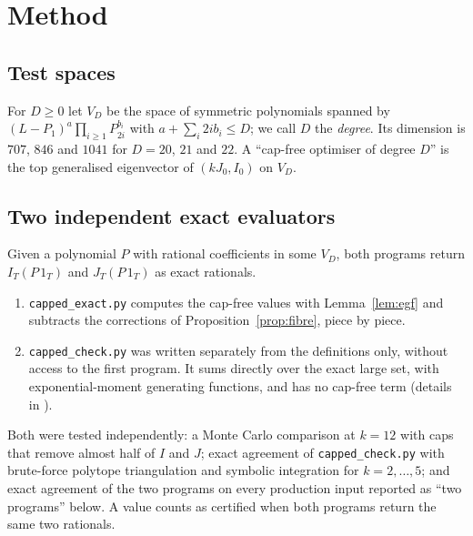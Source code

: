 \section{Method}

\subsection*{Test spaces}
For $D\ge0$ let $V_D$ be the space of symmetric polynomials spanned by
$(L-P_1)^a\prod_{i\ge1}P_{2i}^{b_i}$ with $a+\sum_i2ib_i\le D$; we call $D$
the \emph{degree}. Its dimension is $707$, $846$ and $1041$ for $D=20$, $21$
and $22$. A ``cap-free optimiser of degree $D$'' is the top generalised
eigenvector of $(kJ_0,I_0)$ on $V_D$.

\subsection*{Two independent exact evaluators}
Given a polynomial $P$ with rational coefficients in some $V_D$, both
programs return $I_T(P\,1_T)$ and $J_T(P\,1_T)$ as exact rationals.
\begin{enumerate}
\item \texttt{capped\_exact.py} computes the cap-free values with
Lemma~\ref{lem:egf} and subtracts the corrections of
Proposition~\ref{prop:fibre}, piece by piece.
\item \texttt{capped\_check.py} was written separately from the definitions
only, without access to the first program. It sums directly over the exact
large set, with exponential-moment generating functions, and has no cap-free
term (details in \cite[\S5]{Kim26}).
\end{enumerate}
Both were tested independently: a Monte Carlo comparison at $k=12$ with caps
that remove almost half of $I$ and $J$; exact agreement of
\texttt{capped\_check.py} with brute-force polytope triangulation and symbolic
integration for $k=2,\dots,5$; and exact agreement of the two programs on every
production input reported as ``two programs'' below. A value counts as
certified when both programs return the same two rationals.

